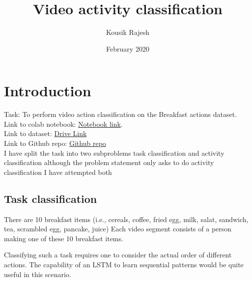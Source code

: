 \documentclass{article}
\title{Video activity classification}
\author{Kousik Rajesh }
\date{February 2020}
\begin{document}
\maketitle

\section*{Introduction}
Task: To perform video action classification on the Breakfast actions dataset.\\
Link to colab notebook: \textcolor{blue}{\href{https://colab.research.google.com/drive/1ThWqv2jwK57T9Aenhff0U7XSn46bT1qS}{Notebook link}.}\\
Link to dataset: \textcolor{blue}{\href{https://drive.google.com/drive/folders/1ZnX1hGODNWyqyYUgabagEK3TogYiJN10?usp=sharing}{Drive Link}}\\
Link to Github repo: \textcolor{blue}{\href{https://github.com/kousikr26/video-activity-classification}{Github repo}}\\

I have split the task into two subproblems task classification and activity classification although the problem statement only asks to do activity classification I have attempted both

\subsection*{Task classification}


There are 10 breakfast items (i.e., cereals, coffee, fried egg, milk, salat, sandwich, tea, scrambled egg, pancake, juice)
Each video segment consists of a person making one of these 10 breakfast items.

Classifying such a task requires one to consider the actual order of different actions. The capability of an LSTM to learn sequential patterns would be quite useful in this scenario.
\end{document}
